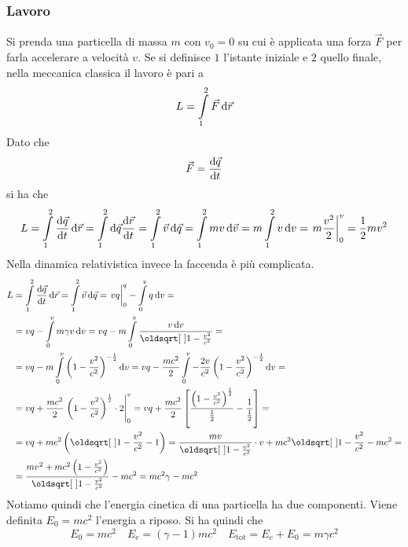 \subsubsection{Lavoro}
Si prenda una particella di massa $m$ con $v_0=0$ su cui è applicata una forza $\vec{F}$ per farla
accelerare a velocità $v$. Se si definisce $1$ l'istante iniziale e $2$ quello finale, nella
meccanica classica il lavoro è pari a
\begin{equation*}
  L = \int\limits_{1}^{2} \vec{F}\mathop{}\!\mathrm{d}\vec{r}
\end{equation*}
Dato che
\begin{equation*}
  \vec{F} = \frac{\mathop{}\!\mathrm{d} \vec{q}}{\mathop{}\!\mathrm{d} t}
\end{equation*}
si ha che
\begin{equation*}
  L= \int\limits_{1}^{2} \der{\vec{q}}{t}\dif\vec{r}=
  \int\limits_{1}^{2}\dif\vec{q}\der{\vec{r}}{t}=\int\limits_{1}^{2} \vec{v}\dif\vec{q}=
  \int\limits_{1}^{2} mv\dif\vec{v}=m \int\limits_{1}^{2} v\dif v=
  \left.m \frac{v^2}{2}\right|_0^v=\frac{1}{2}mv^2
\end{equation*}
Nella dinamica relativistica invece la faccenda è più complicata.
\begin{align*}
  L &= \int\limits_{1}^{2} \der{\vec{q}}{t}\dif\vec{r}= \int\limits_{1}^{2} \vec{v}\dif\vec{q}=
  \left.\vphantom{\int}vq\right|_0^q-\int\limits_{0}^{v} q\dif v=\\
  &=vq-\int\limits_{0}^{v} m\gamma v\dif v=  
  vq-m \int\limits_{0}^{v} \frac{v\dif v}{\sqrt{1-\frac{v^2}{c^2}}}=\\
  &=vq-m \int\limits_{0}^{v} \left( 1-\frac{v^2}{c^2} \right)^{-\frac{1}{2}}\dif v=
  vq-\frac{mc^2}{2}
  \int\limits_{0}^{v} -\frac{2v}{c^2}\left( 1-\frac{v^2}{c^2} \right)^{-\frac{1}{2}}\dif v=\\
  &=vq+\frac{mc^2}{2}\left.\left( 1-\frac{v^2}{c^2}  \right)^{\frac{1}{2}}\cdot2\right|_0^v=
  vq+\frac{mc^2}{2} \left[ \frac{\left(1-\frac{v^2}{c^2}\right)^{\frac{1}{2}}}{\frac{1}{2}}-
  \frac{1}{\frac{1}{2}}\right]=\\
  &=vq+mc^2\left(\sqrt{1-\frac{v^2}{c^2}}-1\right)=\frac{mv}{\sqrt{1-\frac{v^2}{c^2}}}\cdot v+
  mc^2\sqrt{1-\frac{v^2}{c^2}}-mc^2=\\
  &=\frac{mv^2+mc^2\left( 1-\frac{v^2}{c^2} \right)}{\sqrt{1-\frac{v^2}{c^2}}}-mc^2=
  mc^2\gamma-mc^2
\end{align*}
Notiamo quindi che l'energia cinetica di una particella ha due componenti. Viene definita
$E_0=mc^2$ l'energia a riposo. Si ha quindi che
\begin{equation*}
  E_0=mc^2\quad E_c=(\gamma-1)mc^2\quad E_{\text{tot}}=E_c+E_0=m\gamma c^2
\end{equation*}

